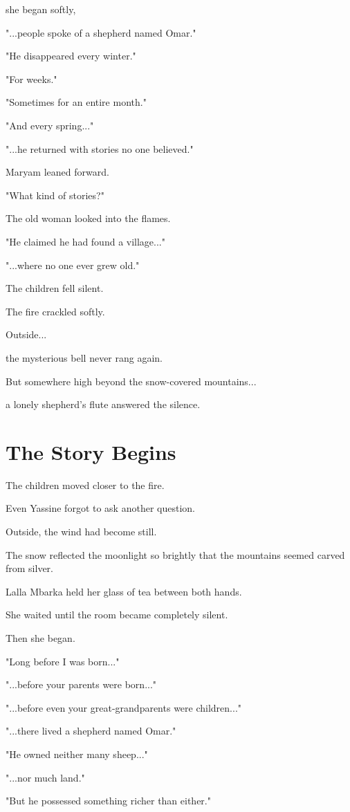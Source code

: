 \documentclass[12pt,openany]{book}
\begin{document}
she began softly,

"...people spoke of a shepherd named Omar."

"He disappeared every winter."

"For weeks."

"Sometimes for an entire month."

"And every spring..."

"...he returned with stories no one believed."

Maryam leaned forward.

"What kind of stories?"

The old woman looked into the flames.

"He claimed he had found a village..."

"...where no one ever grew old."

The children fell silent.

The fire crackled softly.

Outside...

the mysterious bell never rang again.

But somewhere high beyond the snow-covered mountains...

a lonely shepherd's flute answered the silence.
\section*{The Story Begins}

The children moved closer to the fire.

Even Yassine forgot to ask another question.

Outside, the wind had become still.

The snow reflected the moonlight so brightly that the mountains seemed carved from silver.

Lalla Mbarka held her glass of tea between both hands.

She waited until the room became completely silent.

Then she began.

"Long before I was born..."

"...before your parents were born..."

"...before even your great-grandparents were children..."

"...there lived a shepherd named Omar."

"He owned neither many sheep..."

"...nor much land."

"But he possessed something richer than either."
\end{document}
